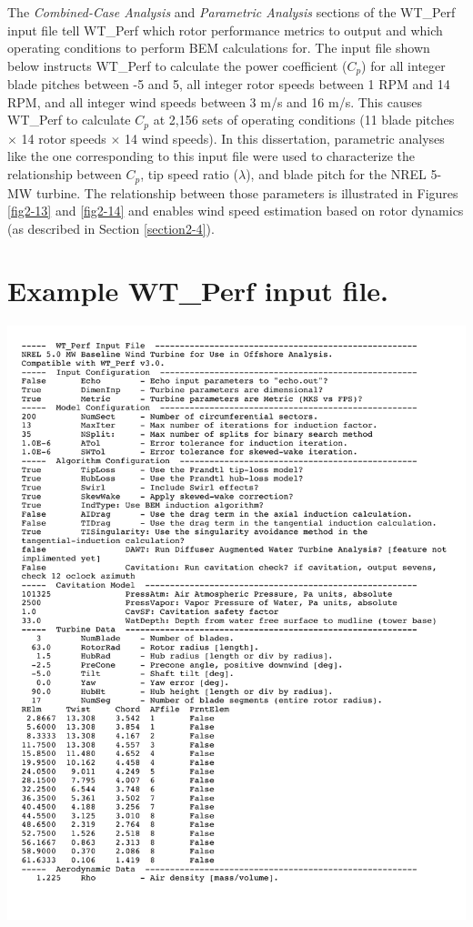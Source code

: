 The \textit{Combined-Case Analysis} and \textit{Parametric Analysis} sections of the WT\_Perf input file tell WT\_Perf which rotor performance metrics to output and which operating conditions to perform BEM calculations for. The input file shown below instructs WT\_Perf to calculate the power coefficient ($C_p$) for all integer blade pitches between -5\degree{} and 5\degree{}, all integer rotor speeds between 1 RPM and 14 RPM, and all integer wind speeds between 3 m/s and 16 m/s. This causes WT\_Perf to calculate $C_p$ at 2,156 sets of operating conditions (11 blade pitches $\times$ 14 rotor speeds $\times$ 14 wind speeds). In this dissertation, parametric analyses like the one corresponding to this input file were used to characterize the relationship between $C_p$, tip speed ratio ($\lambda$), and blade pitch for the NREL 5-MW turbine. The relationship between those parameters is illustrated in Figures \ref{fig2-13} and \ref{fig2-14} and enables wind speed estimation based on rotor dynamics (as described in Section \ref{section2-4}).

\pagebreak
\section{Example WT\_Perf input file.} \label{sectionE-1}

\noindent
\includegraphics[width=\linewidth]{Figures/AppendixEFigures/figE-2.pdf}	

